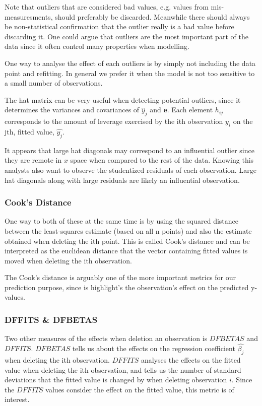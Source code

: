 \documentclass[11pt]{article}
\begin{document}
Note that outliers that are considered bad values, e.g. values from mis-measuresments,
should preferably be discarded. Meanwhile there should
always be non-statistical confirmation that the outlier really is a bad value before discarding it. One
could argue that outliers are the most important part of the data since it often control many 
properties when modelling. 

One way to analyse the effect of each outliers is by simply not including the data point and refitting.
In general we prefer it when the model is not too sensitive to a small number of observations. 

The hat matrix can be very useful when detecting potential outliers, since it determines the variances
and covariances of \(\hat{y}_j\) and \(\textbf{e}\). Each element \(h_{ij}\) corresponds to the amount of
leverage exercised by the ith observation \(y_i\) on the jth, fitted value, \(\hat{y_j}\).

It appears that large hat diagonals may correspond to an influential outlier since they are remote
in \(x\) space when compared to the rest of the data. Knowing this analysts also want to observe
the studentized residuals of each observation. Large hat diagonals along with large residuals 
are likely an influential observation. 

\subsubsection{Cook's Distance}
\label{sec:org44cdcec}

One way to both of these at the same time is by using the squared distance between the least-squares
estimate (based on all n points) and also the estimate obtained when deleting the ith point. This is
called Cook’s distance and can be interpreted as the euclidean distance that the vector containing fitted
values is moved when deleting the ith observation. 

The Cook's distance is arguably one of the more important metrics for our prediction purpose, since is highlight's
the observation's effect on the predicted y-values. \cite{22286}

\subsubsection{DFFITS \& DFBETAS}
\label{sec:org93d67bc}

Two other measures of the effects when deletion an observation is \(DFBETAS\) and \(DFFITS\). \(DFBETAS\) tells us
about the effects on the regression coefficient \(\hat{\beta_j}\) when deleting the ith observation. 
\(DFFITS\) analyses the effects on the fitted value when deleting the ith observation, and tells us
the number of standard deviations that the fitted value is changed by when deleting observation \(i\). Since 
the \(DFFITS\) values consider the effect on the fitted value, this metric is of interest.
\end{document}
